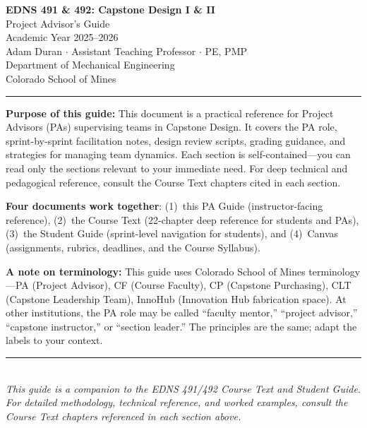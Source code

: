 \documentclass[11pt,letterpaper]{article}
\begin{document}
\begin{center}
{\LARGE\bfseries\textcolor{minesblue}{EDNS 491 \& 492: Capstone Design I \& II}}\\[6pt]
{\Large\textcolor{minesblue}{Project Advisor's Guide}}\\[4pt]
{\large Academic Year 2025--2026}\\[6pt]
{\normalsize Adam Duran $\cdot$ Assistant Teaching Professor $\cdot$ PE, PMP}\\
{\normalsize Department of Mechanical Engineering}\\
{\normalsize Colorado School of Mines}\\[8pt]
\textcolor{minesgold}{\rule{0.7\textwidth}{1.5pt}}
\end{center}

\vspace{12pt}

\textbf{Purpose of this guide:} This document is a practical reference for Project Advisors (PAs) supervising teams in Capstone Design. It covers the PA role, sprint-by-sprint facilitation notes, design review scripts, grading guidance, and strategies for managing team dynamics. Each section is self-contained---you can read only the sections relevant to your immediate need. For deep technical and pedagogical reference, consult the Course Text chapters cited in each section.

\textbf{Four documents work together}: (1)~this PA Guide (instructor-facing reference), (2)~the Course Text (22-chapter deep reference for students and PAs), (3)~the Student Guide (sprint-level navigation for students), and (4)~Canvas (assignments, rubrics, deadlines, and the Course Syllabus).

\textbf{A note on terminology:} This guide uses Colorado School of Mines terminology---PA (Project Advisor), CF (Course Faculty), CP (Capstone Purchasing), CLT (Capstone Leadership Team), InnoHub (Innovation Hub fabrication space). At other institutions, the PA role may be called ``faculty mentor,'' ``project advisor,'' ``capstone instructor,'' or ``section leader.'' The principles are the same; adapt the labels to your context.

\tableofcontents
\newpage














\vspace{1cm}
\begin{center}
\textcolor{minesgold}{\rule{0.5\textwidth}{1.5pt}}\\[8pt]
{\small\textit{This guide is a companion to the EDNS 491/492 Course Text and Student Guide. For detailed methodology, technical reference, and worked examples, consult the Course Text chapters referenced in each section above.}}
\end{center}
\end{document}
